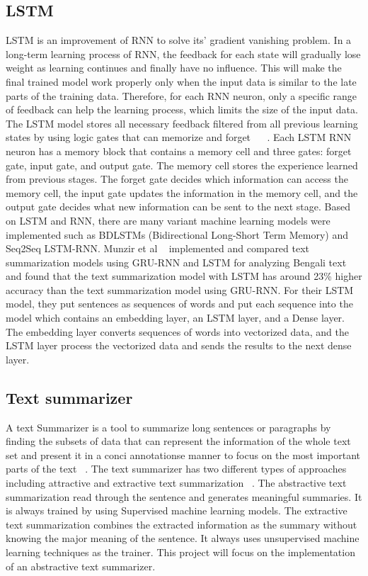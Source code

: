 \documentclass[conference]{IEEEtran}
\begin{document}
\subsection{LSTM}
LSTM is an improvement of RNN to solve its’ gradient vanishing problem. In a long-term learning process of RNN, the feedback for each state will gradually lose weight as learning continues and finally have no influence. This will make the final trained model work properly only when the input data is similar to the late parts of the training data. Therefore, for each RNN neuron, only a specific range of feedback can help the learning process, which limits the size of the input data. The LSTM model stores all necessary feedback filtered from all previous learning states by using logic gates that can memorize and forget ~\citep{hochreiter1997long} ~\citep{gers2000learning}. Each LSTM RNN neuron has a memory block that contains a memory cell and three gates: forget gate, input gate, and output gate. The memory cell stores the experience learned from previous stages. The forget gate decides which information can access the memory cell, the input gate updates the information in the memory cell, and the output gate decides what new information can be sent to the next stage. Based on LSTM and RNN, there are many variant machine learning models were implemented such as BDLSTMs (Bidirectional Long-Short Term Memory) and Seq2Seq LSTM-RNN. Munzir et al ~\citep{Munzir2019} implemented and compared text summarization models using GRU-RNN and LSTM for analyzing Bengali text and found that the text summarization model with LSTM has around 23\% higher accuracy than the text summarization model using GRU-RNN. For their LSTM model, they put sentences as sequences of words and put each sequence into the model which contains an embedding layer, an LSTM layer, and a Dense layer. The embedding layer converts sequences of words into vectorized data, and the LSTM layer process the vectorized data and sends the results to the next dense layer. 
\subsection{Text summarizer}
A text Summarizer is a tool to summarize long sentences or paragraphs by finding the subsets of data that can represent the information of the whole text set and present it in a conci annotationse manner to focus on the most important parts of the text ~\citep{sinha2018extractive}. The text summarizer has two different types of approaches including attractive and extractive text summarization ~\cite{pai2014}. The abstractive text summarization read through the sentence and generates meaningful summaries. It is always trained by using Supervised machine learning models. The extractive text summarization combines the extracted information as the summary without knowing the major meaning of the sentence. It always uses unsupervised machine learning techniques as the trainer. This project will focus on the implementation of an abstractive text summarizer.
\end{document}
